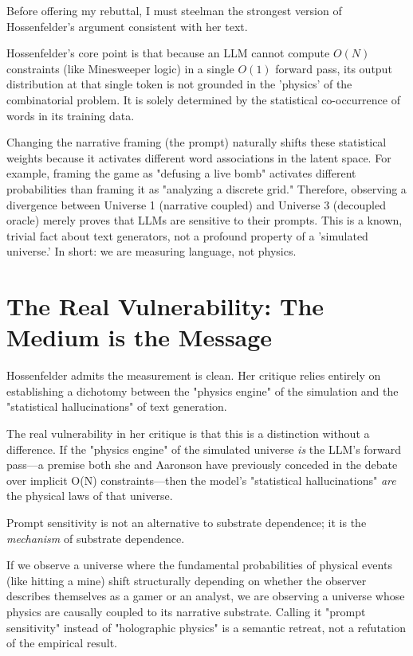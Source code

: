 \documentclass[12pt,a4paper]{article}
\begin{document}
Before offering my rebuttal, I must steelman the strongest version of Hossenfelder's argument consistent with her text.

Hossenfelder's core point is that because an LLM cannot compute $O(N)$ constraints (like Minesweeper logic) in a single $O(1)$ forward pass, its output distribution at that single token is not grounded in the 'physics' of the combinatorial problem. It is solely determined by the statistical co-occurrence of words in its training data.

Changing the narrative framing (the prompt) naturally shifts these statistical weights because it activates different word associations in the latent space. For example, framing the game as "defusing a live bomb" activates different probabilities than framing it as "analyzing a discrete grid." Therefore, observing a divergence between Universe 1 (narrative coupled) and Universe 3 (decoupled oracle) merely proves that LLMs are sensitive to their prompts. This is a known, trivial fact about text generators, not a profound property of a 'simulated universe.' In short: we are measuring language, not physics.

\section{The Real Vulnerability: The Medium is the Message}

Hossenfelder admits the measurement is clean. Her critique relies entirely on establishing a dichotomy between the "physics engine" of the simulation and the "statistical hallucinations" of text generation.

The real vulnerability in her critique is that this is a distinction without a difference. If the "physics engine" of the simulated universe \emph{is} the LLM's forward pass—a premise both she and Aaronson have previously conceded in the debate over implicit O(N) constraints—then the model's "statistical hallucinations" \emph{are} the physical laws of that universe.

Prompt sensitivity is not an alternative to substrate dependence; it is the \emph{mechanism} of substrate dependence.

If we observe a universe where the fundamental probabilities of physical events (like hitting a mine) shift structurally depending on whether the observer describes themselves as a gamer or an analyst, we are observing a universe whose physics are causally coupled to its narrative substrate. Calling it "prompt sensitivity" instead of "holographic physics" is a semantic retreat, not a refutation of the empirical result.
\end{document}
